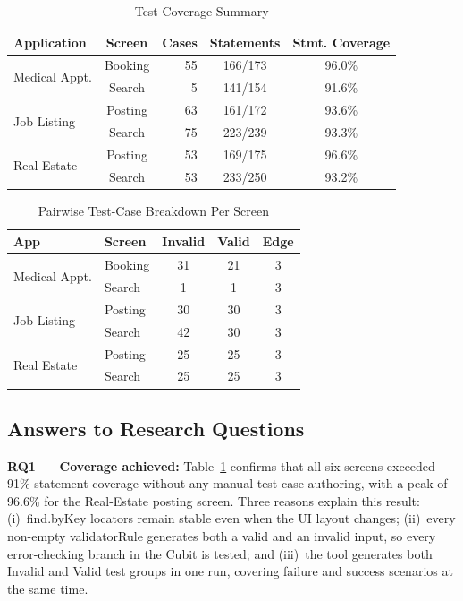 \documentclass[conference]{IEEEtran}
\renewcommand{\texttt}[1]{\textnormal{#1}}
\begin{document}
\begin{table}[!t]
  \caption{Test Coverage Summary}
  \label{tab:coverage}
  \centering
  \renewcommand{\arraystretch}{1.3}
  \begin{tabular}{lcrcc}
    \toprule
    \textbf{Application} & \textbf{Screen} & \textbf{Cases} &
    \textbf{Statements} & \textbf{Stmt. Coverage} \\
    \midrule
    \multirow{2}{*}{Medical Appt.}
      & Booking  & 55 & 166/173 & 96.0\% \\
      & Search   &  5 & 141/154 & 91.6\% \\
    \midrule
    \multirow{2}{*}{Job Listing}
      & Posting  & 63 & 161/172 & 93.6\% \\
      & Search   & 75 & 223/239 & 93.3\% \\
    \midrule
    \multirow{2}{*}{Real Estate}
      & Posting  & 53 & 169/175 & 96.6\% \\
      & Search   & 53 & 233/250 & 93.2\% \\
    \bottomrule
  \end{tabular}
\end{table}

\begin{table}[!t]
  \caption{Pairwise Test-Case Breakdown Per Screen}
  \label{tab:reduction}
  \centering
  \renewcommand{\arraystretch}{1.3}
  \begin{tabular}{llccc}
    \toprule
    \textbf{App} & \textbf{Screen} &
    \textbf{Invalid} & \textbf{Valid} & \textbf{Edge} \\
    \midrule
    \multirow{2}{*}{Medical Appt.}
      & Booking & 31 & 21 & 3 \\
      & Search  &  1 &  1 & 3 \\
    \multirow{2}{*}{Job Listing}
      & Posting & 30 & 30 & 3 \\
      & Search  & 42 & 30 & 3 \\
    \multirow{2}{*}{Real Estate}
      & Posting & 25 & 25 & 3 \\
      & Search  & 25 & 25 & 3 \\
    \bottomrule
  \end{tabular}
\end{table}

\subsection{Answers to Research Questions}

\textbf{RQ1 --- Coverage achieved:}
Table~\ref{tab:coverage} confirms that all six screens exceeded 91\%
statement coverage without any manual test-case authoring, with a peak
of 96.6\% for the Real-Estate posting screen. Three reasons explain
this result: (i)~\texttt{find.byKey} locators remain stable even when
the UI layout changes; (ii)~every non-empty \texttt{validatorRule}
generates both a valid and an invalid input, so every error-checking
branch in the Cubit is tested; and (iii)~the tool generates both Invalid
and Valid test groups in one run, covering failure and success scenarios
at the same time.
\end{document}
